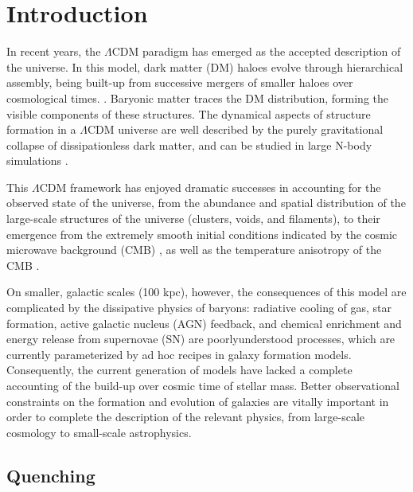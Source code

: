 \newcommand\mynote[1]{\textcolor{red}{#1}}
\newcommand\persnote[1]{\textcolor{green}{#1}}

\chapter{Introduction}

In recent years, the $\Lambda$CDM paradigm has emerged as the accepted description of the universe.
In this model, dark matter (DM) haloes evolve through hierarchical assembly, being built-up from successive mergers of smaller haloes over cosmological times. \citep{Gott:1975ab,Press:1974aa,White:1978aa,Blumenthal:1984aa,Davis:1985aa,White:1991aa,Barnes:1992aa,Cole:2000aa}.
Baryonic matter traces the DM distribution, forming the visible components of these structures.
The dynamical aspects of structure formation in a $\Lambda$CDM universe are well described by the purely gravitational collapse of dissipationless dark matter, and can be studied in large N-body simulations \citep[e.g.,][]{Springel:2005aa,Thomas:1992aa,Navarro:1995aa,Weinberg:2004aa}.

This $\Lambda$CDM framework has enjoyed dramatic successes in accounting for the observed state of the universe, from the abundance and spatial distribution of the large-scale structures of the universe (clusters, voids, and filaments), to their emergence from the extremely smooth initial conditions indicated by the cosmic microwave background (CMB) \citep{Springel:2006aa}, as well as the temperature anisotropy of the CMB \citep[][and references therein]{Narlikar:2001aa}.


On smaller, galactic scales (100 kpc), however, the consequences of this model are complicated by the dissipative physics of baryons:
radiative cooling of gas, star formation, active galactic nucleus (AGN) feedback, and chemical enrichment and energy release from supernovae (SN) are poorly\-understood processes, which are currently parameterized by ad hoc recipes in galaxy formation models.
Consequently, the current generation of models have lacked a complete accounting of the build-up over cosmic time of stellar mass.
Better observational constraints on the formation and evolution of galaxies are vitally important in order to complete the description of the relevant physics, from large-scale cosmology to small-scale astrophysics.

\section{Quenching}

